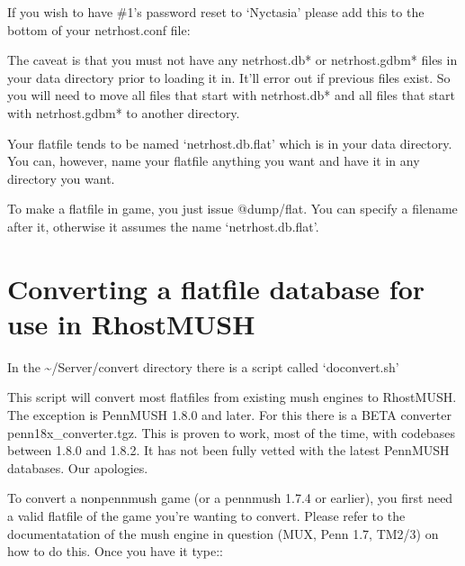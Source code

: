 \documentclass[letterpaper,10pt,english]{sphinxmanual}
\begin{document}
\sphinxAtStartPar
If you wish to have \#1’s password reset to ‘Nyctasia’ please add this
to the bottom of your netrhost.conf file:

\begin{sphinxVerbatim}[commandchars=\\\{\}]
 
\end{sphinxVerbatim}

\sphinxAtStartPar
The caveat is that you must not have any netrhost.db* or netrhost.gdbm* files
in your data directory prior to loading it in.  It’ll error out if previous
files exist.  So you will need to move all files that start with netrhost.db*
and all files that start with netrhost.gdbm* to another directory.

\sphinxAtStartPar
Your flatfile tends to be named ‘netrhost.db.flat’ which is in your data
directory.  You can, however, name your flatfile anything you want and have
it in any directory you want.

\sphinxAtStartPar
To make a flatfile in game, you just issue @dump/flat.  You can specify
a filename after it, otherwise it assumes the name ‘netrhost.db.flat’.


\section{Converting a flatfile database for use in RhostMUSH}
\label{\detokenize{database:converting-a-flatfile-database-for-use-in-rhostmush}}
\sphinxAtStartPar
In the \textasciitilde{}/Server/convert directory there is a script called ‘doconvert.sh’

\sphinxAtStartPar
This script will convert most flatfiles from existing mush engines to
RhostMUSH.  The exception is PennMUSH 1.8.0 and later.  For this there is a
BETA converter penn18x\_converter.tgz.  This is proven to work, most of the time,
with codebases between 1.8.0 and 1.8.2.  It has not been fully vetted with
the latest PennMUSH databases.  Our apologies.

\sphinxAtStartPar
To convert a non\sphinxhyphen{}pennmush game (or a pennmush 1.7.4 or earlier), you first
need a valid flatfile of the game you’re wanting to convert.  Please refer
to the documentatation of the mush engine in question (MUX, Penn 1.7, TM2/3)
on how to do this.  Once you have it type::

\begin{sphinxVerbatim}[commandchars=\\\{\}]
  
\end{sphinxVerbatim}
\end{document}
